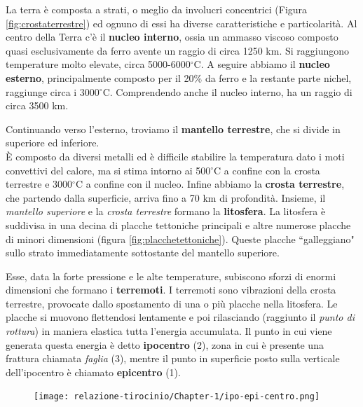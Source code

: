 \documentclass[a4paper,10pt]{memoir}
\begin{document}
La terra è composta a strati, o meglio da involucri concentrici (Figura \ref{fig:crostaterrestre}) ed ognuno di essi ha diverse caratteristiche e particolarità.
Al centro della Terra c'è il \textbf{nucleo interno}, ossia un ammasso viscoso composto quasi esclusivamente da ferro avente un raggio di circa 1250 km. Si raggiungono temperature molto elevate, circa 5000-6000$^{\circ}$C.
A seguire abbiamo il \textbf{nucleo esterno}, principalmente composto per il 20\% da ferro e la restante parte nichel, raggiunge circa i 3000$^{\circ}$C. Comprendendo anche il nucleo interno, ha un raggio di circa 3500 km.

Continuando verso l'esterno, troviamo il \textbf{mantello terrestre}, che si divide in superiore ed inferiore.
\\
È composto da diversi metalli ed è difficile stabilire la temperatura dato i moti convettivi del calore, ma si stima intorno ai 500$^{\circ}$C a confine con la crosta terrestre e 3000$^{\circ}$C a confine con il nucleo.
Infine abbiamo la \textbf{crosta terrestre}, che partendo dalla superficie, arriva fino a 70 km di profondità.
Insieme, il \textit{mantello superiore} e la \textit{crosta terrestre} formano la \textbf{litosfera}.
La litosfera è suddivisa in una decina di placche tettoniche principali e altre numerose placche di minori dimensioni (figura \ref{fig:placchetettoniche}). Queste placche ``galleggiano" sullo strato immediatamente sottostante del mantello superiore.\cite{terra}

Esse, data la forte pressione e le alte temperature, subiscono sforzi di enormi dimensioni che formano i \textbf{terremoti}.
I terremoti sono vibrazioni della crosta terrestre, provocate dallo spostamento  di una o più placche nella litosfera.
Le placche si muovono flettendosi lentamente e poi rilasciando (raggiunto il \textit{punto di rottura}) in maniera elastica tutta l'energia accumulata.
Il punto in cui viene generata questa energia è detto \textbf{ipocentro} (2), zona in cui è presente una frattura chiamata \textit{faglia} (3), mentre il punto in superficie posto sulla verticale dell'ipocentro è chiamato \textbf{epicentro} (1).
\begin{figure}[ht]
\label{fig:ipocentro}
\centering
\texttt{[image: relazione-tirocinio/Chapter-1/ipo-epi-centro.png]}
\end{figure}

\clearpage
\end{document}
